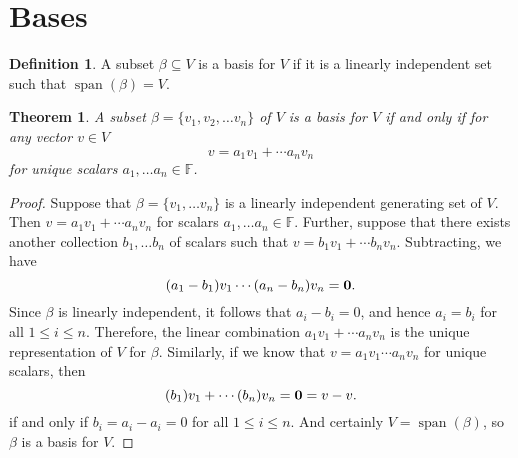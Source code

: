 \documentclass[oneside, 12pt]{book}
\DeclareMathOperator{\spn}{span}
\newtheorem{thm}{Theorem}[section]
\theoremstyle{definition}
\newtheorem{defn}{Definition}[section]
\begin{document}
\section{Bases}
\begin{defn}
\label{defn_basis}
A subset $\beta \subseteq V $ is a basis for $V$ if it is a linearly independent set such that $\spn(\beta)=V$.
\end{defn}
\begin{thm}
\label{thm_uniqbas}
A subset $\beta=\{v_{1},v_{2}, \dots v_{n}\}$ of $V$ is a basis for $V$ if and only if for any vector $v \in V$ \[v=a_{1}v_{1}+\cdots a_{n}v_{n}\] for unique scalars $a_{1}, \dots a_{n} \in \mathbb{F}$.
\end{thm}
\begin{proof}
Suppose that $\beta=\{v_{1}, \dots v_{n}\}$ is a linearly independent generating set of $V$. Then $v=a_{1}v_{1}+\cdots a_{n}v_{n}$ for scalars $a_{1}, \dots a_{n} \in \mathbb{F}$. Further, suppose that there exists another collection $b_{1}, \dots b_{n}$ of scalars such that $v=b_{1}v_{1}+\cdots b_{n}v_{n}$. Subtracting, we have \[(a_{1}-b_{1})v_{1}\cdots (a_{n}-b_{n})v_{n}=\bold{0}.\] Since $\beta$ is linearly independent, it follows that $a_{i}-b_{i}=0$, and hence $a_{i}=b_{i}$ for all $1 \leq i\leq n$. Therefore, the linear combination $a_{1}v_{1}+\cdots a_{n}v_{n}$ is the unique representation of $V$ for $\beta$. Similarly, if we know that $v=a_{1}v_{1}\cdots a_{n}v_{n}$ for unique scalars, then \[(b_{1})v_{1}+\cdots(b_{n})v_{n}=\bold{0}=v-v.\] if and only if $b_{i}=a_{i}-a_{i}=0$ for all $1 \leq i \leq n$. And certainly $V=\spn(\beta)$, so $\beta$ is a basis for $V$.
\end{proof}
\end{document}
